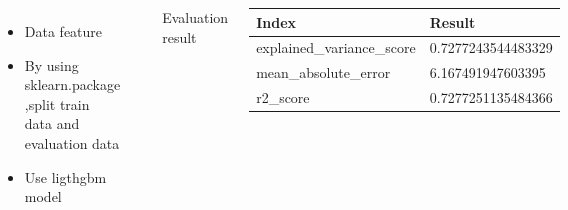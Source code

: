 \documentclass{tikzposter} %
\begin{document}
\begin{columns}
{\begin{itemize}
    \item Data feature
    \vspace{.3cm}
    \vspace{.3cm}
    \item By using sklearn.package ,split train data and evaluation data
    \vspace{.3cm}
    \item Use ligthgbm model
\end{itemize}
\vspace{.5cm}
\begin{center}
  \includegraphics[scale=2]{./figure/feature_importance.eps}
\end{center}
\begin{description}
  \item[Evaluation result]
\end{description}
\vspace{.5cm}
\begin{center}
  \begin{tabular}{p{14cm}p{14cm}}
    \hline
      Index & Result  \\
    \hline
      explained\_variance\_score   & 0.7277243544483329    \\
      mean\_absolute\_error&  6.167491947603395 \\
      r2\_score & 0.7277251135484366  \\
    \hline
  \end{tabular}
\end{center}

}
\end{columns}
\end{document}
